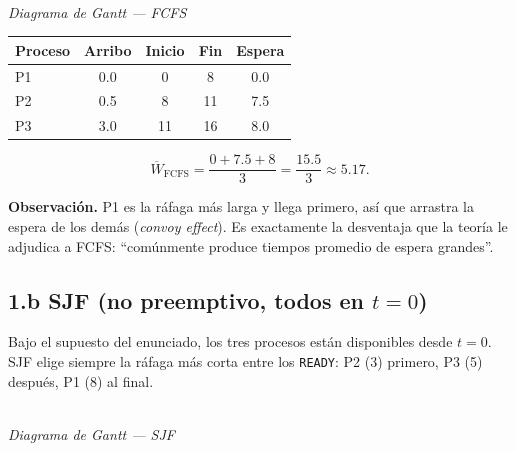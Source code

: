 \documentclass[11pt,a4paper]{article}
\begin{document}
\begin{center}
\\\small\emph{Diagrama de Gantt --- FCFS}
\end{center}

\begin{center}
\small
\begin{tabular}{@{}lcccc@{}}
\toprule
Proceso & Arribo & Inicio & Fin & Espera \\
\midrule
P1 & 0.0 & 0 & 8 & 0.0 \\
P2 & 0.5 & 8 & 11 & 7.5 \\
P3 & 3.0 & 11 & 16 & 8.0 \\
\bottomrule
\end{tabular}
\end{center}

\[
\overline{W}_{\text{FCFS}}
= \frac{0 + 7.5 + 8}{3} = \frac{15.5}{3} \approx 5.17.
\]

\textbf{Observación.} P1 es la ráfaga más larga y llega primero, así
que arrastra la espera de los demás (\emph{convoy effect}). Es
exactamente la desventaja que la teoría le adjudica a FCFS:
``comúnmente produce tiempos promedio de espera grandes''.

\subsection{1.b SJF (no preemptivo, todos en $t = 0$)}

Bajo el supuesto del enunciado, los tres procesos están disponibles
desde $t = 0$. SJF elige siempre la ráfaga más corta entre los
\texttt{READY}: P2 (3) primero, P3 (5) después, P1 (8) al final.

\begin{center}
\\\small\emph{Diagrama de Gantt --- SJF}
\end{center}
\end{document}
